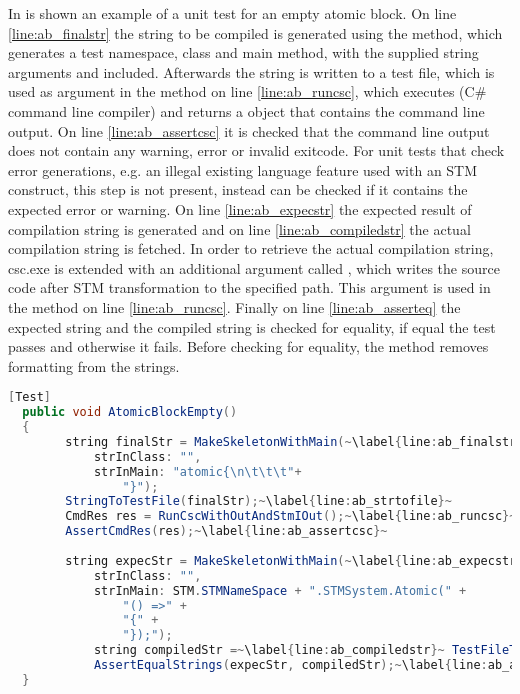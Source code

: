 In  is shown an example of a unit test for an empty atomic block. On line \ref{line:ab_finalstr} the string  to be compiled is generated using the  method, which generates a test namespace, class and main method, with the supplied string arguments  and  included. Afterwards the string is written to a test file, which is used as argument in the method on line \ref{line:ab_runcsc}, which executes  (C\# command line compiler) and returns a  object that contains the command line output. On line \ref{line:ab_assertcsc} it is checked that the command line output does not contain any warning, error or invalid exitcode. For unit tests that check error generations, e.g. an illegal existing language feature used with an \ac{STM} construct, this step is not present, instead  can be checked if it contains the expected error or warning. On line \ref{line:ab_expecstr} the expected result of compilation string  is generated and on line \ref{line:ab_compiledstr} the actual compilation string  is fetched. In order to retrieve the actual compilation string, csc.exe is extended with an additional argument called , which writes the source code after \ac{STM} transformation to the specified path. This argument is used in the method on line \ref{line:ab_runcsc}. Finally on line \ref{line:ab_asserteq} the expected string and the compiled string is checked for equality, if equal the test passes and otherwise it fails. Before checking for equality, the  method removes formatting from the strings.

\begin{lstlisting}[float, label=lst:empty_atomic_block,
  caption={Empty Atomic Block Unit Test},
  language=Java,  
  showspaces=false,
  showtabs=false,
  breaklines=true,
  showstringspaces=false,
  breakatwhitespace=true,
  escapechar=~,
  commentstyle=\color{greencomments},
  keywordstyle=\color{bluekeywords},
  stringstyle=\color{redstrings},
  morekeywords={atomic, retry, orelse, var, get, set, ref, out, Test}]  % Start your code-block
  [Test]
  public void AtomicBlockEmpty()
  {
  		string finalStr = MakeSkeletonWithMain(~\label{line:ab_finalstr}~
  			strInClass: "",
  			strInMain: "atomic{\n\t\t\t"+ 
  				"}");
  		StringToTestFile(finalStr);~\label{line:ab_strtofile}~
  		CmdRes res = RunCscWithOutAndStmIOut();~\label{line:ab_runcsc}~
  		AssertCmdRes(res);~\label{line:ab_assertcsc}~
  		
  		string expecStr = MakeSkeletonWithMain(~\label{line:ab_expecstr}~
  			strInClass: "",
  			strInMain: STM.STMNameSpace + ".STMSystem.Atomic(" +
  				"() =>" +
  				"{" +
  				"});");
			string compiledStr =~\label{line:ab_compiledstr}~ TestFileToString(currentCompiledCsFile);
			AssertEqualStrings(expecStr, compiledStr);~\label{line:ab_asserteq}~
  }
\end{lstlisting}

